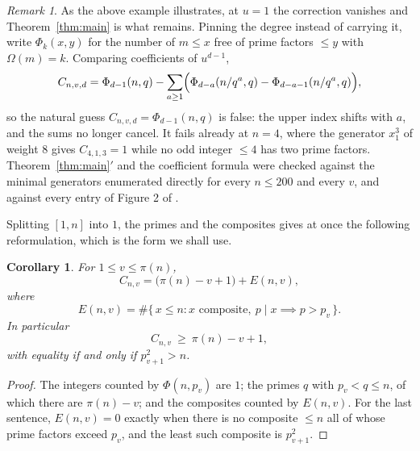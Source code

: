 \documentclass[a4paper,11pt,oneside,reqno]{amsart}
\theoremstyle{definition}
\theoremstyle{remark}
\newtheorem*{remark*}{Remark}
\theoremstyle{plain}
\newtheorem{corollary}[definition]{Corollary}
\newcommand{\Om}{\Omega}
\begin{document}
\begin{remark*}
  As the above example illustrates, at \(u = 1\) the correction vanishes and
  Theorem~\ref{thm:main} is what remains. Pinning the degree instead of carrying it, write \(\Phi_{k}(x,y)\) for
  the number of \(m \le x\) free of prime factors \(\le y\) with \(\Om(m) = k\).
  Comparing coefficients of \(u^{d-1}\),
  \[
    C_{n,v,d} = \Phi_{d-1}(n,q)-\sum_{a \ge 1}
      \Bigl(\Phi_{d-a}\!\left(n/q^{a},q\right)-\Phi_{d-a-1}\!\left(n/q^{a},q\right)\Bigr),
  \]
  so the natural guess \(C_{n,v,d} = \Phi_{d-1}(n,q)\) is false: the upper index
  shifts with \(a\), and the sums no longer cancel. It fails already at
  \(n = 4\), where the generator \(x_1^{3}\) of weight \(8\) gives
  \(C_{4,1,3} = 1\) while no odd integer \(\le 4\) has two prime factors.
  Theorem~\ref{thm:main}\({}'\) and the coefficient formula were checked against
  the minimal generators enumerated directly for every \(n \le 200\) and every
  \(v\), and against every entry of Figure 2 of \cite{Snellman2000}.
\end{remark*}

Splitting \([1,n]\) into \(1\), the primes and the composites gives at once the
following reformulation, which is the form we shall use.

\begin{corollary}\label{cor:split}
  For \(1 \le v \le \pi(n)\),
  \begin{equation}\label{eq:split}
    C_{n,v} = \bigl(\pi(n)-v+1\bigr)+E(n,v),
  \end{equation}
  where
  \begin{equation}\label{eq:Edef}
    E(n,v) = \#\{\,x \le n :
      x \text{ composite},\ p \mid x \implies p > p_v\,\}.
  \end{equation}
  In particular
  \begin{equation}\label{eq:lowerbound}
    C_{n,v}\ \ge \ \pi(n)-v+1,
  \end{equation}
  with equality if and only if \(p_{v+1}^{2} > n\).
\end{corollary}

\begin{proof}
  The integers counted by \(\Phi(n,p_v)\) are \(1\); the primes \(q\) with
  \(p_v < q \le n\), of which there are \(\pi(n)-v\); and the composites
  counted by \(E(n,v)\). For the last sentence, \(E(n,v) = 0\) exactly when there
  is no composite \(\le n\) all of whose prime factors exceed \(p_v\), and the
  least such composite is \(p_{v+1}^{2}\).
\end{proof}
\end{document}

